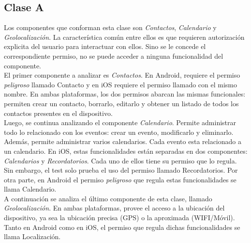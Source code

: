\subsection{Clase A}
Los componentes que conforman esta clase son \emph{Contactos}, \emph{Calendario} y \emph{Geolocalización}. La característica común entre ellos es que requieren autorización explicita del usuario para interactuar con ellos. Sino se le concede el correspondiente permiso, no se puede acceder a ninguna funcionalidad del componente.\\
El primer componente a analizar es \emph{Contactos}. En Android, requiere el permiso \textit{peligroso} llamado Contacto y en iOS requiere el permiso llamado con el mismo nombre. En ambas plataformas, los dos permisos abarcan las mismas funcionales: permiten crear un contacto, borrarlo, editarlo y obtener un listado de todos los contactos presentes en el dispositivo.\\
Luego, se continua analizando el componente \emph{Calendario}. Permite administrar todo lo relacionado con los eventos: crear un evento, modificarlo y eliminarlo. Además, permite administrar varios calendarios. Cada evento esta relacionado a un calendario. En iOS, estas funcionalidades están separadas en dos componentes: \emph{Calendarios} y \emph{Recordatorios}. Cada uno de ellos tiene su permiso que lo regula. Sin embargo, el test solo prueba el uso del permiso llamado Recordatorios. Por otra parte, en Android el permiso \textit{peligroso} que regula estas funcionalidades se llama Calendario.\\
A continuación se analiza el último componente de esta clase, llamado \emph{Geolocalización}. En ambas plataformas, provee el acceso a la ubicación del dispositivo, ya sea la ubicación precisa (GPS) o la aproximada (WIFI/Móvil). Tanto en Android como en iOS, el permiso que regula dichas funcionalidades se llama Localización.\\
